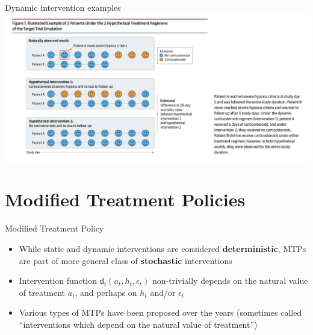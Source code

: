 \documentclass[
  10pt,
  ignorenonframetext,
]{beamer}
\begin{document}
\begin{frame}{Dynamic intervention examples}
\protect\hypertarget{dynamic-intervention-examples-1}{}
\includegraphics{img/jama_dynamic.png}
\end{frame}

\hypertarget{modified-treatment-policies}{%
\section{Modified Treatment
Policies}\label{modified-treatment-policies}}

\begin{frame}{Modified Treatment Policy}
\protect\hypertarget{modified-treatment-policy}{}
\begin{itemize}
\item
  While static and dynamic interventions are considered
  \textbf{deterministic}, MTPs are part of more general class of
  \textbf{stochastic} interventions
\item
  Intervention function \(\mathsf{d}_t(a_t, h_t, \epsilon_t)\)
  non-trivially depends on the natural value of treatment \(a_t\), and
  perhaps on \(h_t\) and/or \(\epsilon_t\)
\item
  Various types of MTPs have been proposed over the years (sometimes
  called ``interventions which depend on the natural value of
  treatment'')
\end{itemize}
\end{frame}
\end{document}
